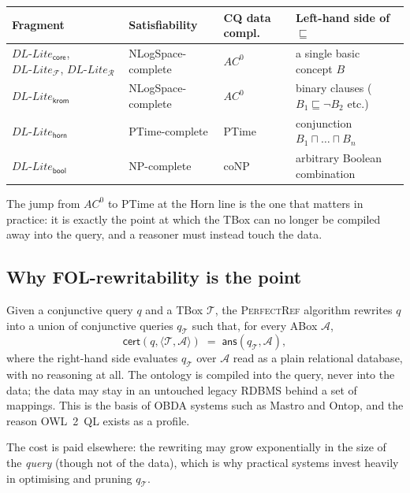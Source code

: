 \documentclass[11pt,a4paper]{article}
\newcommand{\dllite}[1]{\ensuremath{\textit{DL-Lite}_{#1}}}
\newcommand{\sub}{\sqsubseteq}
\begin{document}
\begin{table}[h]
\centering
\footnotesize
\begin{tabular}{@{}lllp{4.1cm}@{}}
\toprule
\textbf{Fragment} & \textbf{Satisfiability} & \textbf{CQ data compl.} &
\textbf{Left-hand side of $\sub$}\\
\midrule
$\dllite{\mathsf{core}}$, $\dllite{\mathcal{F}}$, $\dllite{\mathcal{R}}$
  & NLogSpace-complete & $AC^0$ & a single basic concept $B$\\
$\dllite{\mathsf{krom}}$
  & NLogSpace-complete & $AC^0$ & binary clauses ($B_1 \sub \neg B_2$ etc.)\\
$\dllite{\mathsf{horn}}$
  & PTime-complete & PTime & conjunction $B_1 \sqcap \dots \sqcap B_n$\\
$\dllite{\mathsf{bool}}$
  & NP-complete & coNP & arbitrary Boolean combination\\
\bottomrule
\end{tabular}
\end{table}

\noindent
The jump from $AC^0$ to PTime at the Horn line is the one that matters in
practice: it is exactly the point at which the TBox can no longer be compiled
away into the query, and a reasoner must instead touch the data.

\subsection*{Why FOL-rewritability is the point}

Given a conjunctive query $q$ and a TBox $\mathcal{T}$, the \textsc{PerfectRef}
algorithm rewrites $q$ into a union of conjunctive queries $q_{\mathcal{T}}$
such that, for every ABox $\mathcal{A}$,
\[
  \mathsf{cert}(q, \langle \mathcal{T}, \mathcal{A}\rangle)
  \;=\;
  \mathsf{ans}(q_{\mathcal{T}}, \mathcal{A}),
\]
where the right-hand side evaluates $q_{\mathcal{T}}$ over $\mathcal{A}$ read as
a plain relational database, with no reasoning at all. The ontology is compiled
into the query, never into the data; the data may stay in an untouched legacy
RDBMS behind a set of mappings. This is the basis of OBDA systems such as
Mastro and Ontop, and the reason OWL~2~QL exists as a profile.

The cost is paid elsewhere: the rewriting may grow exponentially in the size of
the \emph{query} (though not of the data), which is why practical systems invest
heavily in optimising and pruning $q_{\mathcal{T}}$.

\end{document}
